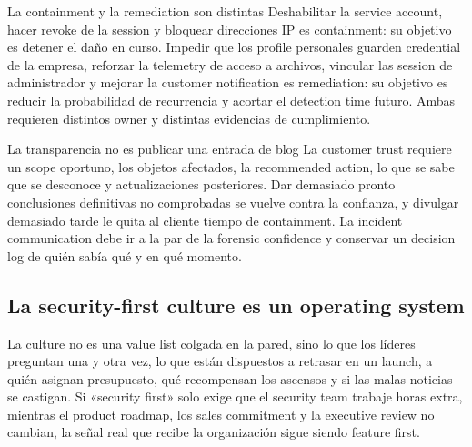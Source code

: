 \begin{importantbox}{La containment y la remediation son distintas}
Deshabilitar la service account, hacer revoke de la session y bloquear direcciones IP es containment: su objetivo es detener el daño en curso. Impedir que los profile personales guarden credential de la empresa, reforzar la telemetry de acceso a archivos, vincular las session de administrador y mejorar la customer notification es remediation: su objetivo es reducir la probabilidad de recurrencia y acortar el detection time futuro. Ambas requieren distintos owner y distintas evidencias de cumplimiento.
\end{importantbox}

\begin{warningbox}{La transparencia no es publicar una entrada de blog}
La customer trust requiere un scope oportuno, los objetos afectados, la recommended action, lo que se sabe que se desconoce y actualizaciones posteriores. Dar demasiado pronto conclusiones definitivas no comprobadas se vuelve contra la confianza, y divulgar demasiado tarde le quita al cliente tiempo de containment. La incident communication debe ir a la par de la forensic confidence y conservar un decision log de quién sabía qué y en qué momento.
\end{warningbox}


\subsection{La security-first culture es un operating system}

La culture no es una value list colgada en la pared, sino lo que los líderes preguntan una y otra vez, lo que están dispuestos a retrasar en un launch, a quién asignan presupuesto, qué recompensan los ascensos y si las malas noticias se castigan. Si «security first» solo exige que el security team trabaje horas extra, mientras el product roadmap, los sales commitment y la executive review no cambian, la señal real que recibe la organización sigue siendo feature first.


